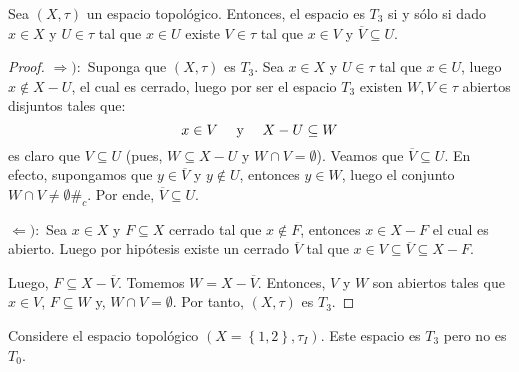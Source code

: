 \documentclass[12pt]{report}
\theoremstyle{largebreak}
\newcommand\contradiction{\ensuremath{\#_c}}
\newcommand{\Cls}[1]{\ensuremath{\overline{#1}}}
\begin{document}
    \begin{propo}
        Sea $(X,\tau)$ un espacio topológico. Entonces, el espacio es $T_3$ si y sólo si dado $x\in X$ y $U\in\tau$ tal que $x\in U$ existe $V\in\tau$ tal que $x\in V$ y $\Cls{V}\subseteq U$.
    \end{propo}

    \begin{proof}
        $\Rightarrow):$ Suponga que $(X,\tau)$ es $T_3$. Sea $x\in X$ y $U\in\tau$ tal que $x\in U$, luego $x\notin X-U$, el cual es cerrado, luego por ser el espacio $T_3$ existen $W,V\in\tau$ abiertos disjuntos tales que:
        \begin{equation*}
            x\in V\quad\textup{ y }\quad X-U\subseteq W
        \end{equation*}
        es claro que $V\subseteq U$ (pues, $W\subseteq X-U$ y $W\cap V=\emptyset$). Veamos que $\Cls{V}\subseteq U$. En efecto, supongamos que $y\in\Cls{V}$ y $y\notin U$, entonces $y\in W$, luego el conjunto $W\cap V\neq\emptyset$\contradiction. Por ende, $\Cls{V}\subseteq U$.

        $\Leftarrow):$ Sea $x\in X$ y $F\subseteq X$ cerrado tal que $x\notin F$, entonces $x\in X-F$ el cual es abierto. Luego por hipótesis existe un cerrado $\Cls{V}$ tal que $x\in V\subseteq\Cls{V}\subseteq X-F$.

        Luego, $F\subseteq X-\Cls{V}$. Tomemos $W=X-\Cls{V}$. Entonces, $V$ y $W$ son abiertos tales que $x\in V$, $F\subseteq W$ y, $W\cap V=\emptyset$. Por tanto, $(X,\tau)$ es $T_3$.
    \end{proof}

    \begin{exa}
        Considere el espacio topológico $(X=\left\{1,2 \right\},\tau_I)$. Este espacio es $T_3$ pero no es $T_0$.
    \end{exa}
\end{document}
